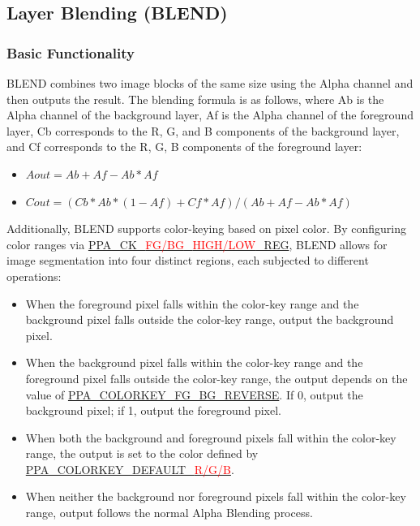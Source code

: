 \documentclass[main\_\_EN.tex]{subfiles}
\begin{document}
\begin{longtable}[c]{ |p{2cm}|p{2cm}|p{2cm}|p{2cm}|p{2cm}|p{2cm}| }
\end{longtable}

\subsection{Layer Blending (BLEND)}

\subsubsection{Basic Functionality}

BLEND combines two image blocks of the same size using the Alpha channel and then outputs the result. The blending formula is as follows, where Ab is the Alpha channel of the background layer, Af is the Alpha channel of the foreground layer, Cb corresponds to the R, G, and B components of the background layer, and Cf corresponds to the R, G, B components of the foreground layer:

\begin{itemize}
    \item $Aout = Ab + Af - Ab*Af$
    \item $Cout = (Cb*Ab*(1-Af) + Cf*Af) / (Ab + Af - Ab*Af)$
\end{itemize}

Additionally, BLEND supports color-keying based on pixel color. By configuring color ranges via \hyperref[regdesc:PPACKBGLOWREG]{PPA\_CK\_\textcolor{red}{FG/BG}\_\textcolor{red}{HIGH/LOW}\_REG}, BLEND allows for image segmentation into four distinct regions, each subjected to different operations:

\begin{itemize}
    \item When the foreground pixel falls within the color-key range and the background pixel falls outside the color-key range, output the background pixel.
    \item When the background pixel falls within the color-key range and the foreground pixel falls outside the color-key range, the output depends on the value of \hyperref[fielddesc:PPACOLORKEYFGBGREVERSE]{PPA\_COLORKEY\_FG\_BG\_REVERSE}. If 0, output the background pixel; if 1, output the foreground pixel.
    \item When both the background and foreground pixels fall within the color-key range, the output is set to the color defined by \hyperref[fielddesc:PPACOLORKEYDEFAULTB]{PPA\_COLORKEY\_DEFAULT\_\textcolor{red}{R/G/B}}.
    \item When neither the background nor foreground pixels fall within the color-key range, output follows the normal Alpha Blending process.
\end{itemize}
\end{document}
